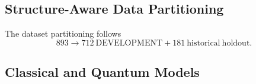 \documentclass[conference]{IEEEtran}
\newif\ifdraftmode
\newcommand{\draftnote}[1]{%
  \ifdraftmode
    \par\noindent
    \colorbox{yellow!30}{\parbox{\dimexpr\columnwidth-2\fboxsep}{%
      \small\sffamily\textcolor{black!70}{#1}}}%
    \par\smallskip
  \fi
}
\begin{document}
\subsection{Structure-Aware Data Partitioning}
\label{sec:partitioning}

\draftnote{%
\textbf{Confirm each value:}\\
\textbullet\ Morgan radius: \textcolor{red}{[?]}\\
\textbullet\ Fingerprint bits: \textcolor{red}{[?]}\\
\textbullet\ Chirality: \textcolor{red}{[yes/no]}\\
\textbullet\ Tanimoto similarity threshold: \textcolor{red}{[?]}\\
\textbullet\ Butina cutoff: \textcolor{red}{[?]}\\
\textbullet\ Clustering implementation: \textcolor{red}{[RDKit version?]}\\
\textbullet\ Group-aware stratification: \textcolor{red}{[describe]}\\
\textbullet\ Five frozen outer folds: \textcolor{red}{[confirm]}\\
\textbullet\ No cluster overlap between folds: \textcolor{red}{[confirm]}\\
\textbullet\ Historical holdout provenance: \textcolor{red}{[describe]}\\
\textbullet\ Exact molecule counts at every stage: \textcolor{red}{[fill in]}\\[4pt]
\textbf{Terminology:} Use ``structure-aware, cluster-disjoint holdout.''
Do \emph{not} call it ``mathematically strict OOD evaluation.''\\
\textbf{Do not:} imply that Butina generated the original ApisTox
splits unless factually correct.}

The dataset partitioning follows
\begin{equation}
893
\longrightarrow
712~\mathrm{DEVELOPMENT}
+
181~\mathrm{historical\ holdout}.
\label{eq:partition}
\end{equation}

\subsection{Classical and Quantum Models}
\label{sec:models}

\draftnote{%
\textbf{Organize with bold paragraph headings, not sub-subsections.}}
\end{document}
